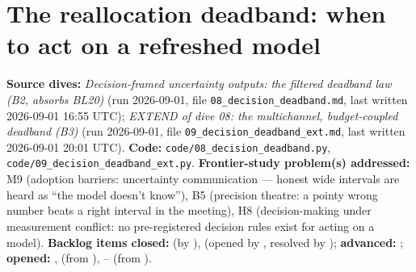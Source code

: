 \chapter{The reallocation deadband: when to act on a refreshed model}
\label{ch:deadband}

\begin{provenance}
\textbf{Source dives:}  \emph{Decision-framed uncertainty outputs: the filtered deadband law (B2, absorbs BL20)} (run 2026-09-01, file \texttt{08\_decision\_deadband.md}, last written 2026-09-01 16:55 UTC);  \emph{EXTEND of dive 08: the multichannel, budget-coupled deadband (B3)} (run 2026-09-01, file \texttt{09\_decision\_deadband\_ext.md}, last written 2026-09-01 20:01 UTC).
\textbf{Code:} \texttt{code/08\_decision\_deadband.py}, \texttt{code/09\_decision\_deadband\_ext.py}.
\textbf{Frontier-study problem(s) addressed:} M9 (adoption barriers: uncertainty communication --- honest wide intervals are heard as ``the model doesn't know''), B5 (precision theatre: a pointy wrong number beats a right interval in the meeting), H8 (decision-making under measurement conflict: no pre-registered decision rules exist for acting on a model).
\textbf{Backlog items closed:}  (by ),  (opened by , resolved by ); \textbf{advanced:} ; \textbf{opened:} ,  (from ), -- (from ).
\end{provenance}

